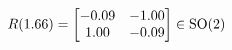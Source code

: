 \documentclass[preview]{standalone}
\begin{document}
\begin{align*}
\special{dvisvgm:raw <g id='unique000'>}R(1.66) = \begin{bmatrix} -0.09 & -1.00 \\ 1.00 & -0.09 \end{bmatrix} \in \text{SO}(2)\special{dvisvgm:raw </g>}
\end{align*}
\end{document}
